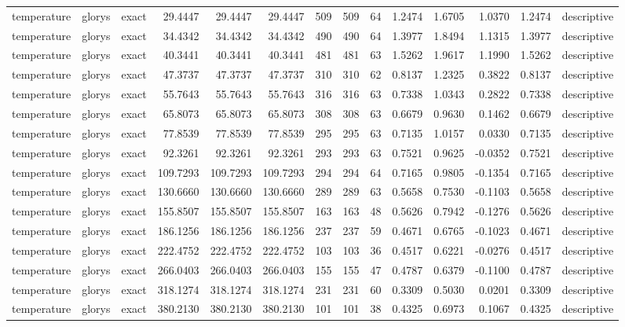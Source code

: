\begin{tabular}{lllrrrrrrrrrrl}
temperature & glorys & exact & 29.4447 & 29.4447 & 29.4447 & 509 & 509 & 64 & 1.2474 & 1.6705 & 1.0370 & 1.2474 & descriptive \\
temperature & glorys & exact & 34.4342 & 34.4342 & 34.4342 & 490 & 490 & 64 & 1.3977 & 1.8494 & 1.1315 & 1.3977 & descriptive \\
temperature & glorys & exact & 40.3441 & 40.3441 & 40.3441 & 481 & 481 & 63 & 1.5262 & 1.9617 & 1.1990 & 1.5262 & descriptive \\
temperature & glorys & exact & 47.3737 & 47.3737 & 47.3737 & 310 & 310 & 62 & 0.8137 & 1.2325 & 0.3822 & 0.8137 & descriptive \\
temperature & glorys & exact & 55.7643 & 55.7643 & 55.7643 & 316 & 316 & 63 & 0.7338 & 1.0343 & 0.2822 & 0.7338 & descriptive \\
temperature & glorys & exact & 65.8073 & 65.8073 & 65.8073 & 308 & 308 & 63 & 0.6679 & 0.9630 & 0.1462 & 0.6679 & descriptive \\
temperature & glorys & exact & 77.8539 & 77.8539 & 77.8539 & 295 & 295 & 63 & 0.7135 & 1.0157 & 0.0330 & 0.7135 & descriptive \\
temperature & glorys & exact & 92.3261 & 92.3261 & 92.3261 & 293 & 293 & 63 & 0.7521 & 0.9625 & -0.0352 & 0.7521 & descriptive \\
temperature & glorys & exact & 109.7293 & 109.7293 & 109.7293 & 294 & 294 & 64 & 0.7165 & 0.9805 & -0.1354 & 0.7165 & descriptive \\
temperature & glorys & exact & 130.6660 & 130.6660 & 130.6660 & 289 & 289 & 63 & 0.5658 & 0.7530 & -0.1103 & 0.5658 & descriptive \\
temperature & glorys & exact & 155.8507 & 155.8507 & 155.8507 & 163 & 163 & 48 & 0.5626 & 0.7942 & -0.1276 & 0.5626 & descriptive \\
temperature & glorys & exact & 186.1256 & 186.1256 & 186.1256 & 237 & 237 & 59 & 0.4671 & 0.6765 & -0.1023 & 0.4671 & descriptive \\
temperature & glorys & exact & 222.4752 & 222.4752 & 222.4752 & 103 & 103 & 36 & 0.4517 & 0.6221 & -0.0276 & 0.4517 & descriptive \\
temperature & glorys & exact & 266.0403 & 266.0403 & 266.0403 & 155 & 155 & 47 & 0.4787 & 0.6379 & -0.1100 & 0.4787 & descriptive \\
temperature & glorys & exact & 318.1274 & 318.1274 & 318.1274 & 231 & 231 & 60 & 0.3309 & 0.5030 & 0.0201 & 0.3309 & descriptive \\
temperature & glorys & exact & 380.2130 & 380.2130 & 380.2130 & 101 & 101 & 38 & 0.4325 & 0.6973 & 0.1067 & 0.4325 & descriptive \\

\end{tabular}
